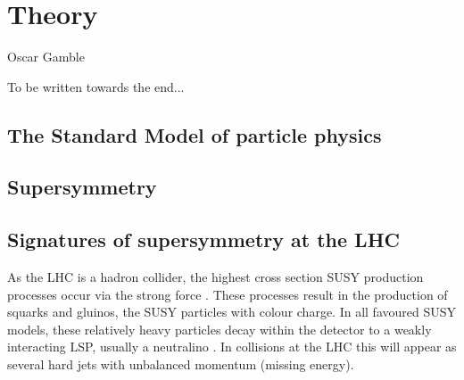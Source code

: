 \chapter{Theory}
\label{chap:theory}

%
{Oscar Gamble}

To be written towards the end...

\section{The Standard Model of particle physics}
\label{sec:sm}


\section{Supersymmetry}
\label{sec:susy}


\section{Signatures of supersymmetry at the LHC}

As the LHC is a hadron collider, the highest cross section SUSY
production processes occur via the strong force
\cite{Martin:1997ns}
\cite{SUSYxsections_NewAspectsof_pp_collisions}. These processes
result in the production of squarks and gluinos, the SUSY particles
with colour charge. In all favoured SUSY models, these relatively
heavy particles decay within the detector to a weakly interacting LSP,
usually a neutralino \cite{Farrar:1978xj}. In
collisions at the LHC this will appear as several hard jets with
unbalanced momentum (missing energy). 

